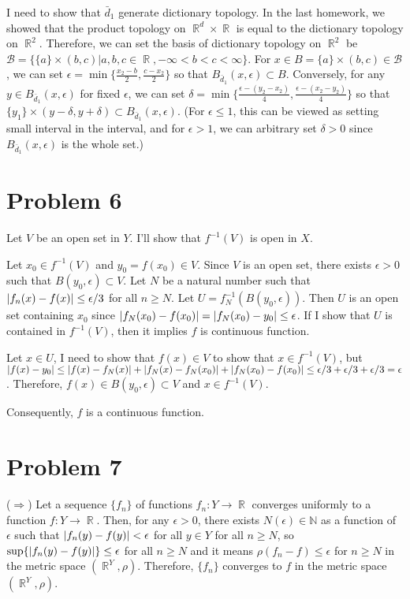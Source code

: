 \documentclass{article}
\DeclareMathOperator{\rr}{\mathbb{R}}
\DeclarePairedDelimiter\abs{\lvert}{\rvert}%
\newcommand{\B}{\mathcal{B}}
\begin{document}
I need to show that $\bar{d}_1$ generate dictionary topology. In the last homework, we showed that the product topology on $\rr^d\times \rr$ is equal to the dictionary topology on $\rr^2$. Therefore, we can set the basis of dictionary topology on $\rr^2$ be $\B=\{\{a\}\times(b,c)|a,b,c\in\rr, -\infty<b<c<\infty\}$. For $x\in B=\{a\}\times(b,c)\in \B$, we can set $\epsilon=\min\{\frac{x_2-b}{2}, \frac{c-x_2}{2}\}$ so that $B_{\bar{d}_1}(x, \epsilon)\subset B$. Conversely, for any $y\in B_{\bar{d}_1}(x, \epsilon)$ for fixed $\epsilon$, we can set $\delta=\min\{\frac{\epsilon-(y_2-x_2)}{4}, \frac{\epsilon-(x_2-y_2)}{4}\}$ so that $\{y_1\}\times (y-\delta, y+\delta)\subset B_{\bar{d}_1}(x, \epsilon)$. (For $\epsilon\leq 1$, this can be viewed as setting small interval in the interval, and for $\epsilon>1$, we can arbitrary set $\delta>0$ since $B_{\bar{d}_1}(x, \epsilon)$ is the whole set.)

\section*{Problem 6}
Let $V$ be an open set in $Y$. I'll show that $f^{-1}(V)$ is open in $X$.

Let $x_0\in f^{-1}(V)$ and $y_0=f(x_0)\in V$. Since $V$ is an open set, there exists $\epsilon>0$ such that $B(y_0, \epsilon)\subset V$. Let $N$ be a natural number such that $\abs{f_n(x)-f(x)}\leq \epsilon/3$ for all $n\geq N$. Let $U=f^{-1}_N (B(y_0, \epsilon))$. Then $U$ is an open set containing $x_0$ since $\abs{f_N(x_0)-f(x_0)}=\abs{f_N(x_0)-y_0}\leq \epsilon$. If I show that $U$ is contained in $f^{-1}(V)$, then it implies $f$ is continuous function.

Let $x\in U$, I need to show that $f(x)\in V$ to show that $x\in f^{-1}(V)$, but $\abs{f(x)-y_0}\leq \abs{f(x)-f_N(x)}+\abs{f_N(x)-f_N(x_0)}+\abs{f_N(x_0)-f(x_0)}\leq \epsilon/3+\epsilon/3+\epsilon/3=\epsilon$. Therefore, $f(x)\in B(y_0,\epsilon)\subset V$ and $x\in f^{-1}(V)$.

Consequently, $f$ is a continuous function.
\section*{Problem 7}
($\Rightarrow$) Let a sequence $\{f_n\}$ of functions $f_n:Y\rightarrow\rr$ converges uniformly to a function $f:Y\rightarrow\rr$. Then, for any $\epsilon>0$, there exists $N(\epsilon)\in \mathbb{N}$ as a function of $\epsilon$ such that $\abs{f_n(y)-f(y)}< \epsilon$ for all $y\in Y$ for all $n\geq N$, so $\sup\{\abs{f_n(y)-f(y)}\}\leq \epsilon$ for all $n\geq N$ and it means $\rho(f_n-f)\leq \epsilon$ for $n\geq N$ in the metric space $(\rr^Y, \rho)$. Therefore, $\{f_n\}$ converges to $f$ in the metric space $(\rr^Y, \rho)$.
\end{document}
